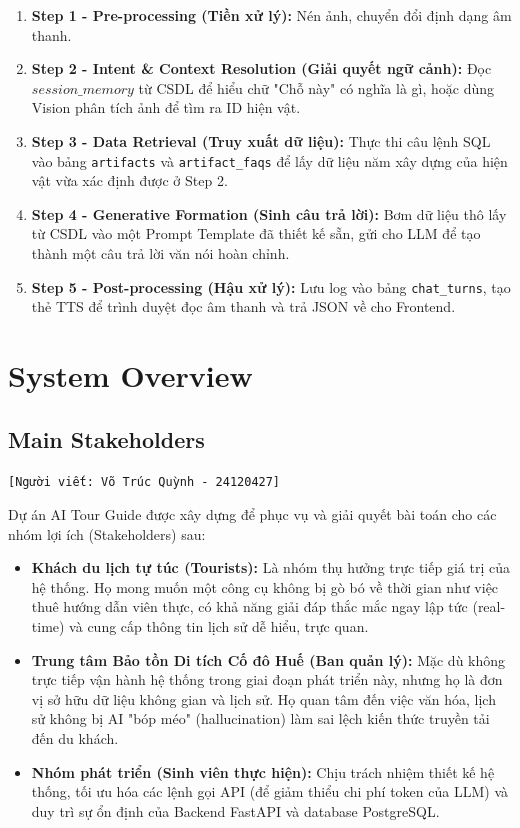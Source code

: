 \begin{enumerate}
    \item \textbf{Step 1 - Pre-processing (Tiền xử lý):} Nén ảnh, chuyển đổi định dạng âm thanh.
    \item \textbf{Step 2 - Intent \& Context Resolution (Giải quyết ngữ cảnh):} Đọc $session\_memory$ từ CSDL để hiểu chữ "Chỗ này" có nghĩa là gì, hoặc dùng Vision phân tích ảnh để tìm ra ID hiện vật.
    \item \textbf{Step 3 - Data Retrieval (Truy xuất dữ liệu):} Thực thi câu lệnh SQL vào bảng \texttt{artifacts} và \texttt{artifact\_faqs} để lấy dữ liệu năm xây dựng của hiện vật vừa xác định được ở Step 2.
    \item \textbf{Step 4 - Generative Formation (Sinh câu trả lời):} Bơm dữ liệu thô lấy từ CSDL vào một Prompt Template đã thiết kế sẵn, gửi cho LLM để tạo thành một câu trả lời văn nói hoàn chỉnh.
    \item \textbf{Step 5 - Post-processing (Hậu xử lý):} Lưu log vào bảng \texttt{chat\_turns}, tạo thẻ TTS để trình duyệt đọc âm thanh và trả JSON về cho Frontend.
\end{enumerate}



\section{System Overview}

\subsection{Main Stakeholders}
\texttt{[Người viết: Võ Trúc Quỳnh - 24120427]}

Dự án AI Tour Guide được xây dựng để phục vụ và giải quyết bài toán cho các nhóm lợi ích (Stakeholders) sau:
\begin{itemize}
    \item \textbf{Khách du lịch tự túc (Tourists):} Là nhóm thụ hưởng trực tiếp giá trị của hệ thống. Họ mong muốn một công cụ không bị gò bó về thời gian như việc thuê hướng dẫn viên thực, có khả năng giải đáp thắc mắc ngay lập tức (real-time) và cung cấp thông tin lịch sử dễ hiểu, trực quan.
    \item \textbf{Trung tâm Bảo tồn Di tích Cố đô Huế (Ban quản lý):} Mặc dù không trực tiếp vận hành hệ thống trong giai đoạn phát triển này, nhưng họ là đơn vị sở hữu dữ liệu không gian và lịch sử. Họ quan tâm đến việc văn hóa, lịch sử không bị AI "bóp méo" (hallucination) làm sai lệch kiến thức truyền tải đến du khách.
    \item \textbf{Nhóm phát triển (Sinh viên thực hiện):} Chịu trách nhiệm thiết kế hệ thống, tối ưu hóa các lệnh gọi API (để giảm thiểu chi phí token của LLM) và duy trì sự ổn định của Backend FastAPI và database PostgreSQL.
\end{itemize}

